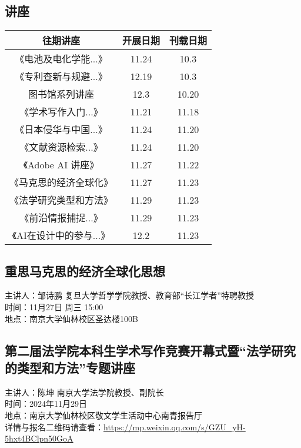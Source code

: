\documentclass[letterpaper, 12pt]{article}
\begin{document}
\begin{multicols}{2}

\section{讲座}
\begin{tabular}{|c|c|c|}
    \hline
    往期讲座 & 开展日期 & 刊载日期\\
    \hline\hline
    《电池及电化学能...》 & 11.24 & 10.3\\
    《专利查新与规避...》 & 12.19 & 10.3\\
    图书馆系列讲座 & 12.3 & 10.20\\
    《学术写作入门...》& 11.21 & 11.18\\
    《日本侵华与中国...》 & 11.24 & 11.20\\
    《文献资源检索...》 & 11.24 & 11.20\\
    《Adobe AI 讲座》 & 11.27 & 11.22\\
    《马克思的经济全球化》 & 11.27 & 11.23\\
    《法学研究类型和方法》 & 11.29 & 11.23\\
    《前沿情报捕捉...》 & 11.29 & 11.23\\
    《AI在设计中的参与...》 & 12.2 & 11.23\\
    \hline
\end{tabular}

\subsection{重思马克思的经济全球化思想}
主讲人：邹诗鹏 复旦大学哲学学院教授、教育部“长江学者”特聘教授\\
时间：11月27日 周三 15:00\\
地点：南京大学仙林校区圣达楼100B\\

\subsection{第二届法学院本科生学术写作竞赛开幕式暨“法学研究的类型和方法”专题讲座}
主讲人：陈坤 南京大学法学院教授、副院长\\
时间：2024年11月29日\\
地点：南京大学仙林校区敬文学生活动中心南青报告厅\\
详情与报名二维码请查看：\url{https://mp.weixin.qq.com/s/GZU_yH-5hxt4BClpn50GoA}\\


\end{multicols}
\end{document}
